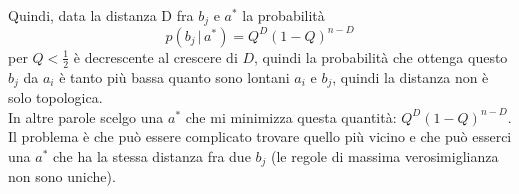 Quindi, data la distanza D fra $b_j$ e $a^*$ la probabilità
\begin{equation*}
p(b_j\,|\,a^*) = Q^D(1-Q)^{n-D}
\end{equation*}
per $Q < \frac12$ è decrescente al crescere di $D$, quindi la probabilità che ottenga questo $b_j$ da $a_i$ è tanto più bassa quanto sono lontani $a_i$ e $b_j$, quindi la distanza non è solo topologica.\\
In altre parole scelgo una $a^*$ che mi minimizza questa quantità: $Q^D(1-Q)^{n-D}$.\\
Il problema è che può essere complicato trovare quello più vicino e che può esserci una $a^*$ che ha la stessa distanza fra due $b_j$ (le regole di massima verosimiglianza non sono uniche).




